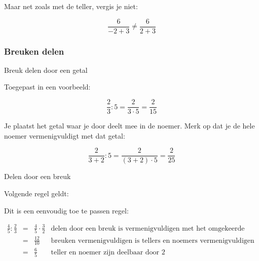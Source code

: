Maar net zoals met de teller, vergis je niet:

\begin{equation*}
\frac{6}{-2+3} \ne \frac{6}{2+3}
\end{equation*}

\subsubsection{Breuken delen}

Breuk delen door een getal


Toegepast in een voorbeeld:

\begin{equation*}
\frac{2}{3}:5=\frac{2}{3 \cdot 5} = \frac{2}{15}
\end{equation*}

Je plaatst het getal waar je door deelt mee in de noemer. Merk op dat je de hele noemer vermenigvuldigt met dat getal:

\begin{equation*}
\frac{2}{3+2}:5=\frac{2}{(3+2) \cdot 5} = \frac{2}{25}
\end{equation*}

Delen door een breuk

Volgende regel geldt:



Dit is een eenvoudig toe te passen regel:

\begin{equation*}
\begin{array}{cclr}
\frac{4}{5} : \frac{2}{3} &=& \frac{4}{5} \cdot \frac{3}{2} & \text{delen door een breuk is vermenigvuldigen met het omgekeerde van die breuk} \\
&=& \frac{12}{10} & \text{breuken vermenigvuldigen is tellers en noemers vermenigvuldigen} \\
&=& \frac{6}{5} & \text{teller en noemer zijn deelbaar door 2}
\end{array}
\end{equation*}

